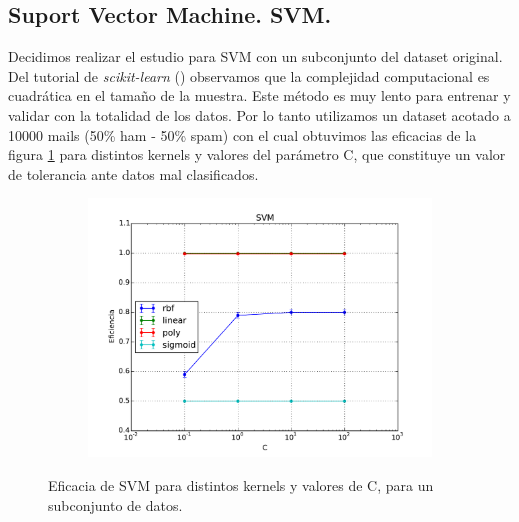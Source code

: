 \documentclass[a4paper,10pt]{article}
\begin{document}
\subsection{Suport Vector Machine. SVM.}

\par Decidimos realizar el estudio para SVM con un subconjunto del dataset original. Del tutorial de \emph{scikit-learn} (\cite{sklearn}) observamos que la complejidad computacional es cuadrática en el tamaño de la muestra. Este método es muy lento para entrenar y validar con la totalidad de los datos. Por lo tanto utilizamos un dataset acotado a 10000 mails (50\% ham - 50\% spam) con el cual obtuvimos las eficacias de la figura \ref{fig:svm} para distintos kernels y valores del parámetro C, que constituye un valor de tolerancia ante datos mal clasificados.

\begin{figure}[H]
  \centering
  \begin{subfigure}[b]{0.4\textwidth}
    \includegraphics[width=\textwidth]{../imagenes/SVM}    
  \end{subfigure}
    \caption{Eficacia de SVM para distintos kernels y valores de C, para un subconjunto de datos.}
  \label{fig:svm}
\end{figure}
\end{document}
